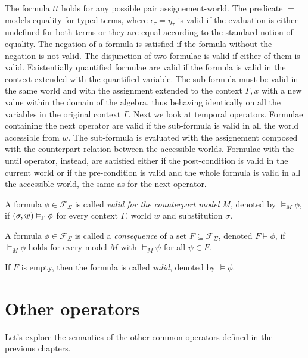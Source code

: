 The formula $tt$ holds for any possible pair assignement-world. The predicate $=$ models equality for typed terms, where
$\epsilon_\tau = \eta_\tau$ is valid if the evaluation is either undefined for both terms or they are equal according to
the standard notion of equality. The negation of a formula is satisfied if the formula without the negation is not
valid. The disjunction of two formulae is valid if either of them is valid. Existentially quantified formulae are valid
if the formula is valid in the context extended with the quantified variable. The sub-formula must be valid in the same
world and with the assignment extended to the context $\Gamma, x$ with a new value within the domain of the algebra,
thus behaving identically on all the variables in the original context $\Gamma$. Next we look at temporal operators.
Formulae containing the next operator are valid if the sub-formula is valid in all the world accessible from $w$. The
sub-formula is evaluated with the assignement composed with the counterpart relation between the accessible worlds.
Formulae with the until operator, instead, are satisfied either if the post-condition is valid in the current world or 
if the pre-condition is valid and the whole formula is valid in all the accessible world, the same as for the next
operator.

\begin{definition}
  A formula $\phi \in \mathcal{F}_\Sigma$ is called \emph{valid for the counterpart model $M$}, denoted by $\vDash_M
  \phi$, if $({\sigma}, {w}) \vDash_{\Gamma} {\phi}$ for every context $\Gamma$, world $w$ and substitution $\sigma$.
\end{definition}
\begin{definition}
  A formula $\phi \in \mathcal{F}_\Sigma$ is called a \emph{consequence} of a set $F \subseteq \mathcal{F}_\Sigma$,
  denoted $F \vDash \phi$, if $\vDash_M \phi$ holds for every model $M$ with $\vDash_M \psi$ for all $\psi \in F$.

  If $F$ is empty, then the formula is called \emph{valid}, denoted by $\vDash \phi$.
\end{definition}

\section{Other operators}
Let's explore the semantics of the other common operators defined in the previous chapters.

